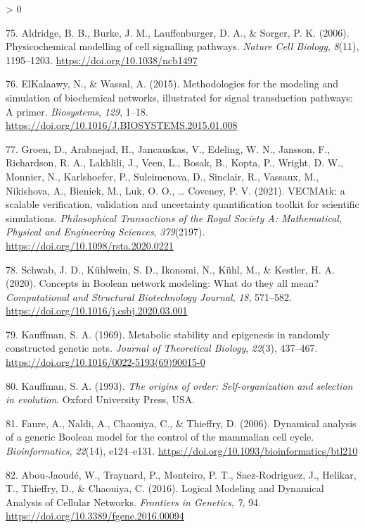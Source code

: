 \documentclass[
  12pt,
]{book}
\newlength{\cslhangindent}
\newenvironment{CSLReferences}[2] %
 {%
  \setlength{\parindent}{0pt}
  \ifodd #1 \everypar{\setlength{\hangindent}{\cslhangindent}}\ignorespaces\fi
  \ifnum #2 > 0
  \setlength{\parskip}{#2\baselineskip}
  \fi
 }%
 {}
\begin{document}
\begin{CSLReferences}{1}{0}
\leavevmode\hypertarget{ref-Aldridge2006}{}%
75. Aldridge, B. B., Burke, J. M., Lauffenburger, D. A., \& Sorger, P. K. (2006). {Physicochemical modelling of cell signalling pathways}. \emph{Nature Cell Biology}, \emph{8}(11), 1195--1203. \url{https://doi.org/10.1038/ncb1497}

\leavevmode\hypertarget{ref-ElKalaawy2015}{}%
76. ElKalaawy, N., \& Wassal, A. (2015). {Methodologies for the modeling and simulation of biochemical networks, illustrated for signal transduction pathways: A primer}. \emph{Biosystems}, \emph{129}, 1--18. \url{https://doi.org/10.1016/J.BIOSYSTEMS.2015.01.008}

\leavevmode\hypertarget{ref-Groen2021}{}%
77. Groen, D., Arabnejad, H., Jancauskas, V., Edeling, W. N., Jansson, F., Richardson, R. A., Lakhlili, J., Veen, L., Bosak, B., Kopta, P., Wright, D. W., Monnier, N., Karlshoefer, P., Suleimenova, D., Sinclair, R., Vassaux, M., Nikishova, A., Bieniek, M., Luk, O. O., \ldots{} Coveney, P. V. (2021). {VECMAtk: a scalable verification, validation and uncertainty quantification toolkit for scientific simulations}. \emph{Philosophical Transactions of the Royal Society A: Mathematical, Physical and Engineering Sciences}, \emph{379}(2197). \url{https://doi.org/10.1098/rsta.2020.0221}

\leavevmode\hypertarget{ref-Schwab2020}{}%
78. Schwab, J. D., Kühlwein, S. D., Ikonomi, N., Kühl, M., \& Kestler, H. A. (2020). {Concepts in Boolean network modeling: What do they all mean?} \emph{Computational and Structural Biotechnology Journal}, \emph{18}, 571--582. \url{https://doi.org/10.1016/j.csbj.2020.03.001}

\leavevmode\hypertarget{ref-Kauffman1969}{}%
79. Kauffman, S. A. (1969). {Metabolic stability and epigenesis in randomly constructed genetic nets}. \emph{Journal of Theoretical Biology}, \emph{22}(3), 437--467. \url{https://doi.org/10.1016/0022-5193(69)90015-0}

\leavevmode\hypertarget{ref-Kauffman1993}{}%
80. Kauffman, S. A. (1993). \emph{{The origins of order: Self-organization and selection in evolution}}. Oxford University Press, USA.

\leavevmode\hypertarget{ref-Faure2006}{}%
81. Faure, A., Naldi, A., Chaouiya, C., \& Thieffry, D. (2006). {Dynamical analysis of a generic Boolean model for the control of the mammalian cell cycle}. \emph{Bioinformatics}, \emph{22}(14), e124--e131. \url{https://doi.org/10.1093/bioinformatics/btl210}

\leavevmode\hypertarget{ref-Abou-Jaoude2016}{}%
82. Abou-Jaoudé, W., Traynard, P., Monteiro, P. T., Saez-Rodriguez, J., Helikar, T., Thieffry, D., \& Chaouiya, C. (2016). {Logical Modeling and Dynamical Analysis of Cellular Networks}. \emph{Frontiers in Genetics}, \emph{7}, 94. \url{https://doi.org/10.3389/fgene.2016.00094}


\end{CSLReferences}
\end{document}
